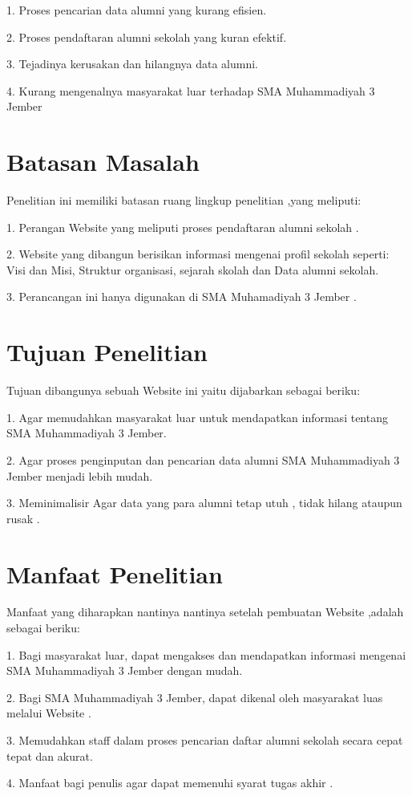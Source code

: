 \documentclass{jtetiproposalskripsi}
\begin{document}
1.	Proses pencarian data alumni yang kurang efisien.

2.	Proses pendaftaran alumni sekolah yang kuran efektif.

3.	Tejadinya kerusakan dan hilangnya data alumni.

4.	Kurang mengenalnya masyarakat luar terhadap SMA Muhammadiyah 3 Jember

\section{Batasan Masalah}
Penelitian ini memiliki batasan ruang lingkup penelitian ,yang meliputi:

1.	Perangan Website yang meliputi proses pendaftaran alumni sekolah .

2.	Website yang dibangun berisikan informasi mengenai profil sekolah seperti: Visi dan Misi, Struktur organisasi, sejarah skolah dan Data alumni sekolah.

3.	Perancangan ini hanya digunakan di SMA Muhamadiyah 3 Jember .


\section{Tujuan Penelitian}
Tujuan dibangunya sebuah Website ini yaitu dijabarkan sebagai beriku:

1.	Agar memudahkan masyarakat luar untuk mendapatkan informasi tentang SMA Muhammadiyah 3 Jember.

2.	Agar proses penginputan dan pencarian data alumni SMA Muhammadiyah 3 Jember menjadi lebih mudah.

3.	Meminimalisir Agar data yang para alumni tetap utuh , tidak hilang ataupun rusak  .

\section{Manfaat Penelitian}
 Manfaat yang diharapkan nantinya  nantinya setelah pembuatan Website ,adalah sebagai beriku:

1.	Bagi masyarakat luar, dapat mengakses dan mendapatkan informasi mengenai SMA Muhammadiyah 3 Jember dengan mudah.

2.	Bagi SMA Muhammadiyah 3 Jember, dapat dikenal oleh masyarakat luas melalui Website .

3.	Memudahkan staff dalam proses pencarian daftar alumni sekolah secara cepat tepat dan akurat.

4.	Manfaat bagi penulis agar dapat memenuhi syarat tugas akhir .
\end{document}
